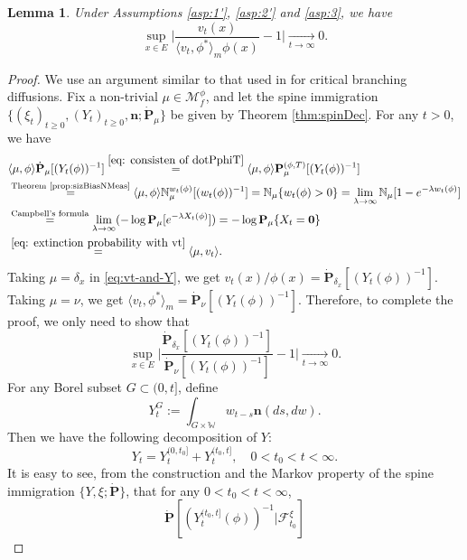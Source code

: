 \documentclass[UTF8]{pkuthss}
\theoremstyle{plain}
\newtheorem{lem}[thm]{Lemma}
\theoremstyle{definition}
\numberwithin{equation}{section}
\begin{document}
\begin{lem}\label{lem:Kolmogorov-1}
	Under Assumptions  \ref{asp:1'}, \ref{asp:2'} and \ref{asp:3}, we have
\[
	\sup_{x\in E}\Big | \frac{v_t(x)}{\langle v_t, \phi^*\rangle_m \phi(x)} - 1\Big |
	\xrightarrow[t\to\infty]{} 0.
\]
\end{lem}
\begin{proof}
	We use an argument similar to that used in \cite{Powell2019Invariance} for critical branching diffusions.
Fix a non-trivial $\mu \in \mathcal M_f^\phi$, and let the spine
 immigration $\{(\xi_t)_{t\geq 0}, (Y_t)_{t\geq 0}, \mathbf n; \dot {\mathbf P}_\mu\}$ be given by Theorem \ref{thm:spinDec}.
For any $t > 0$, we have
\begin{align}\label{eq:vt-and-Y}
	&\langle \mu,\phi\rangle \dot {\mathbf P}_\mu [(Y_t(\phi))^{-1}]
	\overset{\eqref{eq: consisten of dotPphiT}}{=}
	\langle \mu,\phi\rangle \mathbf P^{(\phi,T)}_\mu [(Y_t(\phi))^{-1}]
	\\&\overset{\text{Theorem \ref{prop:sizBiasNMeas}}}{=} \langle \mu,\phi\rangle \mathbb N_\mu^{w_t(\phi)} [ (w_t(\phi))^{-1}]
	= \mathbb N_{\mu}\{w_t(\phi)>0\}
	= \lim_{\lambda \to \infty} \mathbb N_\mu[1-e^{-\lambda w_t(\phi)}]
	\\&\overset{\text{Campbell's formula}}{=} \lim_{\lambda \to \infty} (-\log \mathbf P_\mu[e^{-\lambda X_t(\phi)}])
	= -\log \mathbf P_{\mu} \{ X_t = \mathbf 0\} \\
	& \overset{\eqref{eq: extinction probability with vt}}{=} \langle \mu,v_t \rangle.
\end{align}
	Taking $\mu = \delta_x$ in \eqref{eq:vt-and-Y}, we get $v_t(x)/\phi(x)=\dot{\mathbf P}_{\delta_x}[(Y_t(\phi))^{-1}]$.
	Taking $\mu = \nu$, we get $\langle v_t, \phi^*\rangle_m = \dot {\mathbf P}_{\nu} [(Y_t(\phi))^{-1}]$.
	Therefore, to complete the proof, we only need to show that
\[
	\sup_{x\in E}\Big | \frac {\dot{\mathbf P}_{\delta_x}[(Y_t(\phi))^{-1}]} {\dot {\mathbf P}_\nu [(Y_t(\phi))^{-1}]}-1\Big|
	\xrightarrow[t\to\infty]{} 0.
\]
	For any Borel subset $G\subset (0,t]$, define
\[
	Y^G_t
	:= \int_{G\times \mathbb W} w_{t-s} \mathbf n(ds,dw).
\]
	Then we have the following decomposition of $Y$:
\begin{equation}\label{eq:decomposition-on-Y}
	Y_t
	= Y^{(0,t_0]}_t + Y^{(t_0,t]}_t,
	\quad 0 < t_0 < t < \infty.
\end{equation}
	It is easy to see, from the construction and the Markov property of the spine immigration $\{Y,\xi; \dot {\mathbf P}\}$, that for any $0 < t_0 < t < \infty$,
\[
	\dot{\mathbf P} [(Y_t^{(t_0,t]}(\phi))^{-1}|\mathscr F^\xi_{t_0}]
\]
\end{proof}
\end{document}
